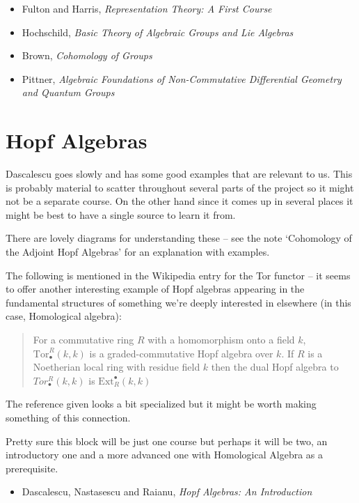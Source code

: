 \documentclass[article]{article}
\begin{document}
\begin{itemize}
	\item[]{Fulton and Harris, \textit{Representation Theory: A First Course}}
	\item[]{Hochschild, \textit{Basic Theory of Algebraic Groups and Lie Algebras}}
	\item[]{Brown, \textit{Cohomology of Groups}}
	\item[]{Pittner, \textit{Algebraic Foundations of Non-Commutative Differential Geometry and Quantum Groups}}
\end{itemize}

\section{Hopf Algebras}

Dascalescu goes slowly and has some good examples that are relevant to us. This is probably material to scatter throughout several parts of the project so it might not be a separate course. On the other hand since it comes up in several places it might be best to have a single source to learn it from.

There are lovely diagrams for understanding these -- see the note `Cohomology of the Adjoint Hopf Algebras' for an explanation with examples.

The following is mentioned in the Wikipedia entry for the Tor functor -- it seems to offer another interesting example of Hopf algebras appearing in the fundamental structures of something we're deeply interested in elsewhere (in this case, Homological algebra):
\begin{quote}
	For a commutative ring $R$ with a homomorphism onto a field $k$, $\text{Tor}_\bullet^R(k, k)$ is a graded-commutative Hopf algebra over $k$. If $R$ is a Noetherian local ring with residue field $k$ then the dual Hopf algebra to $Tor_\bullet^R(k,k)$ is $\text{Ext}^\bullet_R(k, k)$
\end{quote}
The reference given looks a bit specialized but it might be worth making something of this connection.

Pretty sure this block will be just one course but perhaps it will be two, an introductory one and a more advanced one with Homological Algebra as a prerequisite.

\begin{itemize}
	\item[]{Dascalescu, Nastasescu and Raianu, \textit{Hopf Algebras: An Introduction}}
\end{itemize}
\end{document}
